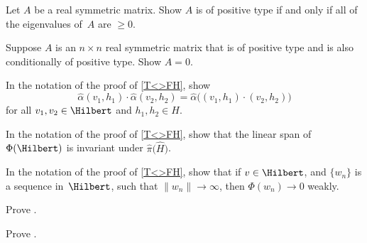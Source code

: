 \begin{exercises}

\item \label{PosTypeIffInnerProdEx}
Let $A$ be a real symmetric matrix.
Show $A$ is of positive type if and only if all of the eigenvalues of~$A$ are $\ge 0$.

\item \label{PosAndCond->0}
Suppose $A$ is an $n \times n$ real symmetric matrix that is of positive type and is also conditionally of positive type. Show $A = 0$.

\item \label{alphahatIsAction}
In the notation of the proof of \cref{T<>FH}, show
	$$ \widehat\alpha(v_1,h_1) \cdot \widehat\alpha(v_2,h_2) 
	= \widehat\alpha \bigl( (v_1,h_1) \cdot (v_2,h_2) \bigr) $$
for all $v_1,v_2 \in \Hilbert$ and $h_1,h_2 \in H$.


\item \label{SpanIsHInvt}
In the notation of the proof of \cref{T<>FH}, show that the linear span of $\Phi(\Hilbert)$ is invariant under $\widehat\pi \bigl( \widehat H \bigr)$.

\item \label{T->FH-WeaklyToZeroEx}
In the notation of the proof of \cref{T<>FH}, show that if $v \in \Hilbert$, and $\{w_n\}$ is a sequence in~$\Hilbert$, such that $\| w_n \| \to \infty$, then
	$\Phi( w_n ) \to 0$ weakly.

\item \label{CondPosTypeFromActionEx}
Prove .

\item \label{PosTypeFromActionEx}
Prove .


\end{exercises}
